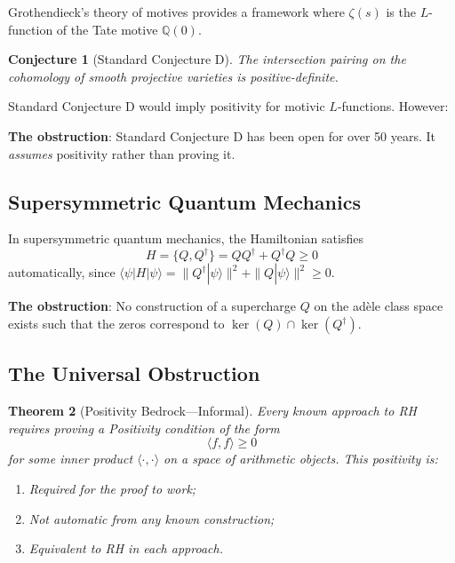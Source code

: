 \documentclass[12pt, a4paper]{article}
\newtheorem{theorem}{Theorem}[section]
\newtheorem{conjecture}[theorem]{Conjecture}
\theoremstyle{definition}
\newcommand{\Q}{\mathbb{Q}}
\begin{document}
Grothendieck's theory of motives provides a framework where $\zeta(s)$ is the $L$-function of the Tate motive $\Q(0)$.

\begin{conjecture}[Standard Conjecture D]
The intersection pairing on the cohomology of smooth projective varieties is positive-definite.
\end{conjecture}

Standard Conjecture D would imply positivity for motivic $L$-functions. However:

\textbf{The obstruction}: Standard Conjecture D has been open for over 50 years. It \textit{assumes} positivity rather than proving it.

\subsection{Supersymmetric Quantum Mechanics}

In supersymmetric quantum mechanics, the Hamiltonian satisfies
\begin{equation}
H = \{Q, Q^\dagger\} = QQ^\dagger + Q^\dagger Q \geq 0
\end{equation}
automatically, since $\langle \psi | H | \psi \rangle = \|Q^\dagger|\psi\rangle\|^2 + \|Q|\psi\rangle\|^2 \geq 0$.

\textbf{The obstruction}: No construction of a supercharge $Q$ on the ad\`ele class space exists such that the zeros correspond to $\ker(Q) \cap \ker(Q^\dagger)$.

\subsection{The Universal Obstruction}

\begin{theorem}[Positivity Bedrock---Informal]
Every known approach to RH requires proving a Positivity condition of the form
\begin{equation}
\langle f, f \rangle \geq 0
\end{equation}
for some inner product $\langle \cdot, \cdot \rangle$ on a space of arithmetic objects. This positivity is:
\begin{enumerate}
\item Required for the proof to work;
\item Not automatic from any known construction;
\item Equivalent to RH in each approach.
\end{enumerate}
\end{theorem}
\end{document}

